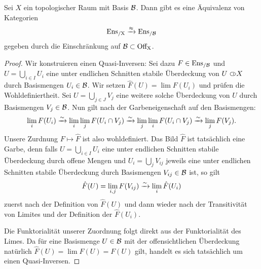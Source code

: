 \begin{satz} \label{sheaf-on-basis}
  Sei $X$ ein topologischer Raum mit Basis $\mathcal{B}$. Dann gibt es eine
  Äquivalenz von Kategorien
  \[ \operatorname{Ens_{/X}} \xrightarrow{\approx} \operatorname{Ens_{/\mathcal{B}}} \]
  gegeben durch die Einschränkung auf $\mathcal{B} \subset \operatorname{Off_X}$.
\end{satz}
\begin{proof}
  Wir konstruieren einen Quasi-Inversen: Sei dazu $F \in \operatorname{Ens_{/\mathcal{B}}}$ und $U
  = \bigcup_{i \in I} U_i$ eine unter endlichen Schnitten stabile
  Überdeckung von $U \subset\kern-0.58em\circ X$ durch Basismengen $U_i \in \mathcal{B}$. Wir
  setzen $\hat{F}(U) = \lim F(U_i)$ und prüfen die
  Wohldefiniertheit. Sei $U = \bigcup_{j \in J} V_j$ eine weitere
  solche Überdeckung von $U$ durch Basismengen $V_j \in \mathcal{B}$. Nun gilt
  nach der Garbeneigenschaft auf den Basismengen:
  \[ \lim_i F(U_i)
  \xrightarrow[]{\sim} \lim_i \lim_j F(U_i \cap V_j)
  \xrightarrow[]{\sim} \lim_j \lim_i F(U_i \cap V_j)
  \xrightarrow[]{\sim} \lim_j F(V_j) .\]
  Unsere Zurdnung $F \mapsto \hat{F}$ ist also wohldefiniert. Das Bild
  $\hat{F}$ ist tatsächlich eine Garbe, denn falls $U = \bigcup_{i \in
    I} U_i$ eine unter endlichen Schnitten stabile Überdeckung durch
  offene Mengen und $U_i = \bigcup_{j} V_{ij}$ jeweils eine unter endlichen
  Schnitten stabile Überdeckung durch Basismengen $V_{ij} \in \mathcal{B}$ ist,
  so gilt
  \[ \hat{F}(U) = \lim_{i,j} F(V_{ij}) \xrightarrow[]{\sim} \lim_i \hat{F}(U_i) \]
  zuerst nach der Definition von $\hat{F}(U)$ und dann wieder nach der
  Transitivität von Limites und der Definition der $\hat{F}(U_i)$.
  
  Die Funktorialität unserer Zuordnung folgt direkt aus der
  Funktorialität des Limes. Da für eine Basismenge $U \in \mathcal{B}$ mit der
  offensichtlichen Überdeckung natürlich $\hat{F}(U) = \lim F(U) =
  F(U) $ gilt, handelt es sich tatsächlich um einen Quasi-Inversen.
\end{proof}

